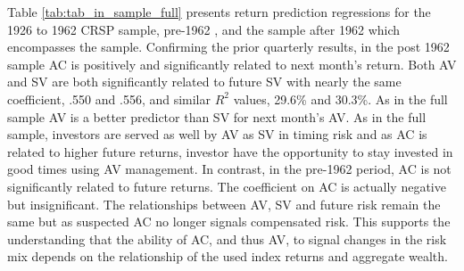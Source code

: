 
Table \ref{tab:tab_in_sample_full} presents return prediction regressions for the 1926 to 1962 CRSP sample, pre-1962 , and the sample after 1962 which encompasses the \citet{pollet_average_2010} sample. Confirming the prior quarterly results, in the post 1962 sample AC is positively and significantly related to next month's return. Both AV and SV are both significantly related to future SV with nearly the same coefficient, .550 and .556, and similar $R^{2}$ values, 29.6\% and 30.3\%. As in the full sample AV is a better predictor than SV for next month's AV. As in the full sample, investors are served as well by AV as SV in timing risk and as AC is related to higher future returns, investor have the opportunity to stay invested in good times using AV management. In contrast, in the pre-1962 period, AC is not significantly related to future returns. The coefficient on AC is actually negative but insignificant. The relationships between AV, SV and future risk remain the same but as suspected AC no longer signals compensated risk. This supports the understanding that the ability of AC, and thus AV, to signal changes in the risk mix depends on the relationship of the used index returns and aggregate wealth.

